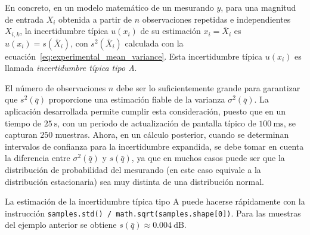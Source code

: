 En concreto, en un modelo matemático de un mesurando $y$, para una magnitud de entrada $X_i$ obtenida a partir de $n$
observaciones repetidas e independientes $X_{i,k}$, la incertidumbre típica $u\left( x_i \right)$ de su estimación
$x_i = \bar{X}_i$ es $u\left( x_i \right) = s\left( \bar{X}_i \right)$, con $s^2\left( \bar{X}_i \right)$ calculada con
la ecuación~\eqref{eq:experimental_mean_variance}.
Esta incertidumbre típica $u\left( x_i \right)$ es llamada \emph{incertidumbre típica tipo A}.

El número de observaciones $n$ debe ser lo suficientemente grande para garantizar que $s^2\left( \bar{q} \right)$
proporcione una estimación fiable de la varianza $\sigma^2\left( \bar{q} \right)$.
La aplicación desarrollada permite cumplir esta consideración, puesto que en un tiempo de $\qty{25}{\s}$, con un periodo
de actualización de pantalla típico de $\qty{100}{\ms}$, se capturan $250$ muestras.
Ahora, en un cálculo posterior, cuando se determinan intervalos de confianza para la incertidumbre expandida, se debe
tomar en cuenta la diferencia entre $\sigma^2\left( \bar{q} \right)$ y $s\left( \bar{q} \right)$, ya que en muchos casos
puede ser que la distribución de probabilidad del mesurando (en este caso equivale a la distribución estacionaria) sea
muy distinta de una distribución normal.

La estimación de la incertidumbre típica tipo A puede hacerse rápidamente con la instrucción
\texttt{samples.std() / math.sqrt(samples.shape[0])}.
Para las muestras del ejemplo anterior se obtiene $s\left( \bar{q} \right) \approx \qty{0.004}{\dB}$.